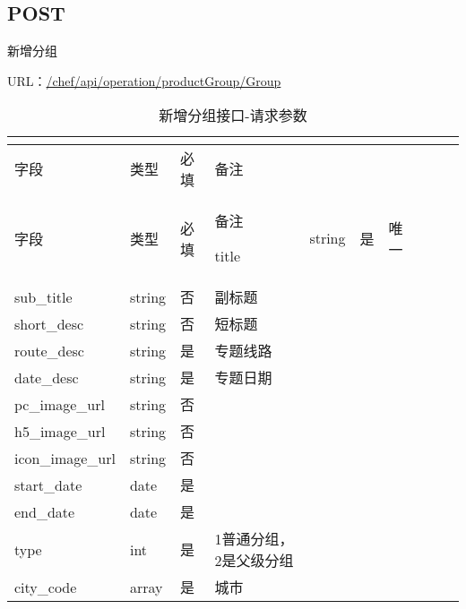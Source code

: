 \subsection{POST}

新增分组

URL：\url{/chef/api/operation/productGroup/Group}



\begin{longtable}{|m{80pt}|m{40pt}|m{50pt}|m{150pt}|}
\tabularnewline\hline
字段&类型&必填&备注
\endhead

\caption{新增分组接口-请求参数}\\
\hline
字段&类型&必填&备注
\endfirsthead

\endfoot

\endlastfoot
\hline
title			&string	&是	&唯一\\
\hline
sub\_title	&string	&否	&副标题\\
\hline
short\_desc	&string	&否	&短标题\\
\hline
route\_desc	&string	&是	&专题线路\\
\hline
date\_desc	&string	&是	&专题日期\\
\hline
pc\_image\_url&string	&否	&\\
\hline
h5\_image\_url&string	&否	&\\
\hline
icon\_image\_url&string&否	&\\
\hline
start\_date	&date	&是	&\\
\hline
end\_date	&date	&是	&\\
\hline
type			&int		&是	&1普通分组，2是父级分组\\
\hline
city\_code	&array	&是	&城市\\
\hline
\end{longtable}


